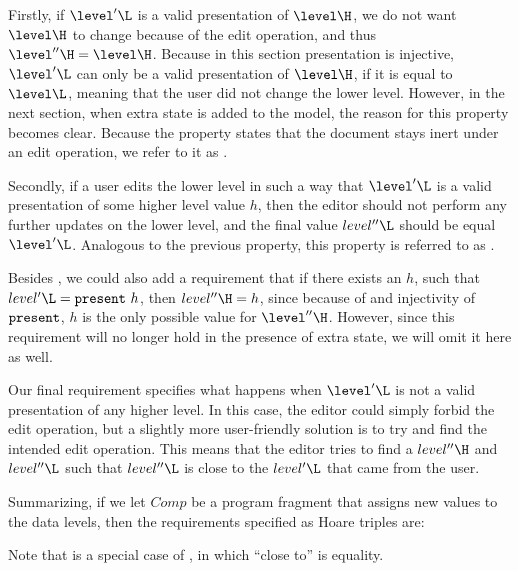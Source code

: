 Firstly, if $\level'\L$ is a valid presentation of $\level\H$, we do not want $\level\H$ to change because of the edit operation, and thus $\level''\H = \level\H$. Because in this section presentation is injective, $\level'\L$ can only be a valid presentation of $\level\H$, if it is equal to $\level\L$, meaning that the user did not change the lower level. However, in the next section, when extra state is added to the model, the reason for this property becomes clear. Because the property states that the document stays inert under an edit operation, we refer to it as .

Secondly, if a user edits the lower level in such a way that $\level'\L$ is a valid presentation of some higher level value $h$, then the editor should not perform any further updates on the lower level, and the final value $level''\L$ should be equal $\level'\L$. Analogous to the previous property, this property is referred to as .

Besides , we could also add a requirement that if there exists an $h$, such that $level'\L = \present~h$, then $level''\H = h$, since because of  and injectivity of ${\tt present}$, $h$ is the only possible value for $\level''\H$. However, since this requirement will no longer hold in the presence of extra state, we will omit it here as well.

Our final requirement specifies what happens when $\level'\L$ is not a valid presentation of any higher level. In this case, the editor could simply forbid the edit operation, but a slightly more user-friendly solution is to try and find the intended edit operation. This means that the editor tries to find a $level''\H$ and $level''\L$ such that $level''\L$ is close to the $level'\L$ that came from the user. 

Summarizing, if we let $Comp$ be a program fragment that assigns new values to the data levels, then the requirements specified as Hoare triples are:


Note that  is a special case of , in which ``close to'' is equality.


